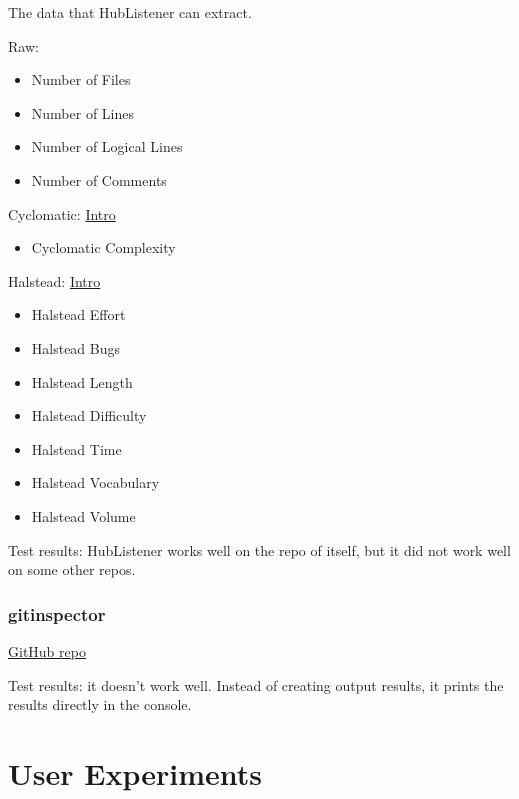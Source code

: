\documentclass[letterpaper,cleveref]{lipics-v2019}
\theoremstyle{definition}
\begin{document}
The data that HubListener can extract.

Raw:
\begin{itemize}
\item Number of Files
\item Number of Lines
\item Number of Logical Lines
\item Number of Comments
\end{itemize}

Cyclomatic:
\href{https://www.geeksforgeeks.org/cyclomatic-complexity/}{Intro}
\begin{itemize}
\item Cyclomatic Complexity
\end{itemize}
 
Halstead:
\href{https://www.geeksforgeeks.org/software-engineering-halsteads-software-metrics/}{Intro}
\begin{itemize}
\item Halstead Effort
\item Halstead Bugs
\item Halstead Length
\item Halstead Difficulty
\item Halstead Time
\item Halstead Vocabulary
\item Halstead Volume
\end{itemize}

Test results: HubListener works well on the repo of itself, but it did not work
well on some other repos.

\subsubsection{gitinspector}
\href{https://github.com/ejwa/gitinspector}{GitHub repo}

Test results: it doesn't work well. Instead of creating output results, it
prints the results directly in the console.

\section{User Experiments}
\end{document}
